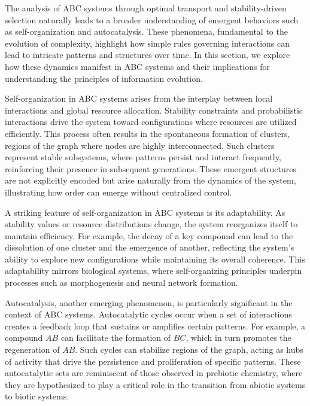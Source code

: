 \documentclass[%
 preprint, linenumbers,
 amsmath,amssymb,
 aps, physrev,
]{revtex4-2}
\begin{document}
The analysis of ABC systems through optimal transport and stability-driven selection naturally leads to a broader understanding of emergent behaviors such as self-organization and autocatalysis. These phenomena, fundamental to the evolution of complexity, highlight how simple rules governing interactions can lead to intricate patterns and structures over time. In this section, we explore how these dynamics manifest in ABC systems and their implications for understanding the principles of information evolution.

Self-organization in ABC systems arises from the interplay between local interactions and global resource allocation. Stability constraints and probabilistic interactions drive the system toward configurations where resources are utilized efficiently. This process often results in the spontaneous formation of clusters, regions of the graph where nodes are highly interconnected. Such clusters represent stable subsystems, where patterns persist and interact frequently, reinforcing their presence in subsequent generations. These emergent structures are not explicitly encoded but arise naturally from the dynamics of the system, illustrating how order can emerge without centralized control.

A striking feature of self-organization in ABC systems is its adaptability. As stability values or resource distributions change, the system reorganizes itself to maintain efficiency. For example, the decay of a key compound can lead to the dissolution of one cluster and the emergence of another, reflecting the system’s ability to explore new configurations while maintaining its overall coherence. This adaptability mirrors biological systems, where self-organizing principles underpin processes such as morphogenesis and neural network formation.

Autocatalysis, another emerging phenomenon, is particularly significant in the context of ABC systems. Autocatalytic cycles occur when a set of interactions creates a feedback loop that sustains or amplifies certain patterns. For example, a compound $AB$ can facilitate the formation of $BC$, which in turn promotes the regeneration of $AB$. Such cycles can stabilize regions of the graph, acting as hubs of activity that drive the persistence and proliferation of specific patterns. These autocatalytic sets are reminiscent of those observed in prebiotic chemistry, where they are hypothesized to play a critical role in the transition from abiotic systems to biotic systems.
\end{document}
